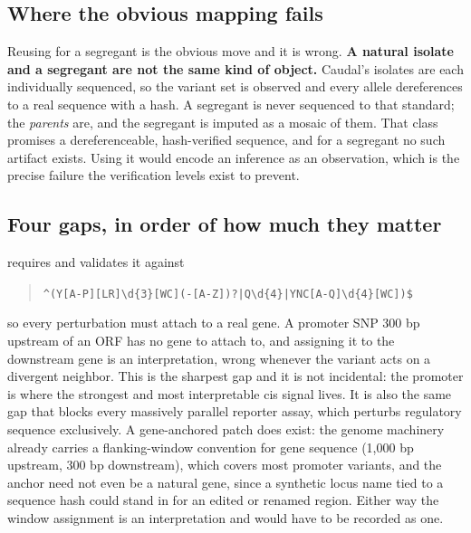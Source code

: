 \subsection{Where the obvious mapping fails}\label{sec:fails}

Reusing  for a segregant is the obvious move and it is
wrong. \textbf{A natural isolate and a segregant are not the same kind of object.} Caudal's
isolates are each individually sequenced, so the variant set is observed and every allele
dereferences to a real sequence with a hash. A segregant is never sequenced to that
standard; the \emph{parents} are, and the segregant is imputed as a mosaic of them. That
class promises a dereferenceable, hash-verified sequence, and for a segregant no such
artifact exists. Using it would encode an inference as an observation, which is the precise
failure the verification levels exist to prevent.

\subsection{Four gaps, in order of how much they matter}

  requires
 and validates it against

\begin{quote}\small
\verb+^(Y[A-P][LR]\d{3}[WC](-[A-Z])?|Q\d{4}|YNC[A-Q]\d{4}[WC])$+
\end{quote}

so every perturbation must attach to a real gene. A promoter SNP 300 bp upstream of an ORF
has no gene to attach to, and assigning it to the downstream gene is an interpretation,
wrong whenever the variant acts on a divergent neighbor. This is the sharpest gap and it is
not incidental: the promoter is where the strongest and most interpretable cis signal lives.
It is also the same gap that blocks every massively parallel reporter assay, which perturbs
regulatory sequence exclusively. A gene-anchored patch does exist: the genome machinery
already carries a flanking-window convention for gene sequence (1,000 bp upstream, 300 bp
downstream), which covers most promoter variants, and the anchor need not even be a
natural gene, since a synthetic locus name tied to a sequence hash could stand in for an
edited or renamed region. Either way the window assignment is an interpretation and would
have to be recorded as one.

